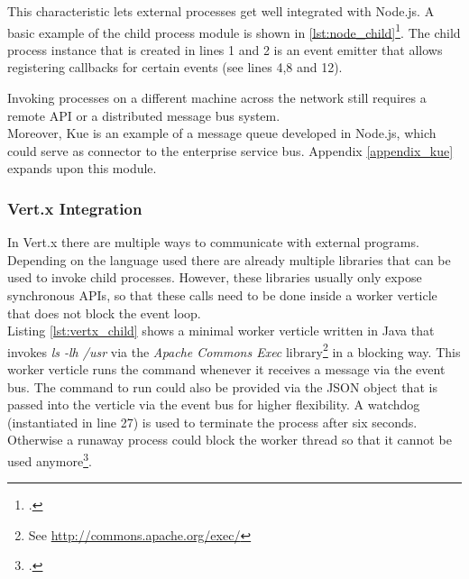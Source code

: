 This characteristic lets external processes get well integrated with Node.js.
A basic example of the child process module is shown in \autoref{lst:node_child}\footcite[Taken from][]{node_child_process}.
The child process instance that is created in lines 1 and 2 is an event emitter that
allows registering callbacks for certain events (see lines 4,8 and 12).



Invoking processes on a different machine across the network still
requires a remote API or a distributed message bus system.\\

Moreover, Kue is an example of a message queue developed in Node.js, which could serve as connector to the enterprise service bus. Appendix \ref{appendix_kue} expands upon this module.


\subsubsection{Vert.x Integration}
\label{vertx_integration}
In Vert.x there are multiple ways to communicate with external programs.
Depending on the language used there are already multiple libraries that can be
used to invoke child processes. However, these libraries usually only expose
synchronous APIs, so that these calls need to be done inside a worker verticle
that does not block the event loop.\\
Listing \ref{lst:vertx_child} shows a minimal worker verticle written in Java
that invokes \textit{ls -lh /usr} via the \textit{Apache Commons Exec}
library\footnote{See \url{http://commons.apache.org/exec/}} in a blocking way.
This worker verticle runs the command whenever it receives a message via the event bus.
The command to run could also be provided via the JSON object that is passed
into the verticle via the event bus for higher flexibility. A watchdog
(instantiated in line 27) is used to terminate the process after six seconds.
Otherwise a runaway process could block the worker thread so that it cannot be
used anymore\footcite[Cf.][67]{Evi_2007}.



